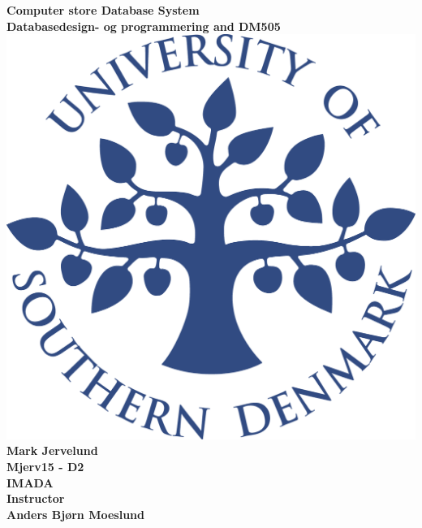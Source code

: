 \documentclass[a4paper,10pt,titlepage]{report}
\date{}
\begin{document}
\begin{titlepage}
\centering
    \vspace*{9\baselineskip}
    \huge
    \bfseries
    Computer store Database System \\
    \normalfont 
	\huge    
    Databasedesign- og programmering and DM505  \\[4\baselineskip]
    \normalfont
	\includegraphics[scale=0.2]{SDU_logo}
    \vfill
    Mark Jervelund \\ Mjerv15 - D2 \\ 
    \vspace{5mm}
    IMADA \\
    \vspace{5mm} Instructor \\ 
    Anders Bjørn Moeslund
    \\ \vspace{5mm}
    \textbf{\datedate} \\[2\baselineskip]
\end{titlepage}

\renewcommand{\thepage}{\roman{page}}%
\tableofcontents

\newpage
\setcounter{page}{1}
\renewcommand{\thepage}{\arabic{page}}
\end{document}
